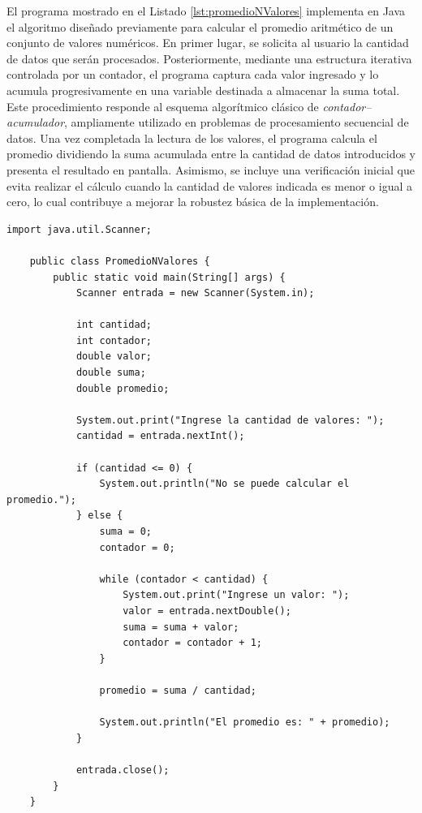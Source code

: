 \documentclass[12pt,twoside]{book}
\begin{document}
					El programa mostrado en el Listado \ref{lst:promedioNValores} implementa en Java el algoritmo diseñado previamente para calcular el promedio aritmético de un conjunto de valores numéricos. En primer lugar, se solicita al usuario la cantidad de datos que serán procesados. Posteriormente, mediante una estructura iterativa controlada por un contador, el programa captura cada valor ingresado y lo acumula progresivamente en una variable destinada a almacenar la suma total. Este procedimiento responde al esquema algorítmico clásico de \emph{contador--acumulador}, ampliamente utilizado en problemas de procesamiento secuencial de datos. Una vez completada la lectura de los valores, el programa calcula el promedio dividiendo la suma acumulada entre la cantidad de datos introducidos y presenta el resultado en pantalla. Asimismo, se incluye una verificación inicial que evita realizar el cálculo cuando la cantidad de valores indicada es menor o igual a cero, lo cual contribuye a mejorar la robustez básica de la implementación.
					
					\begin{lstlisting}[style=Java,caption={Calculo del Promedio de N Valores},label={lst:promedioNValores}]
	import java.util.Scanner;
	
	public class PromedioNValores {
		public static void main(String[] args) {
			Scanner entrada = new Scanner(System.in);
			
			int cantidad;
			int contador;
			double valor;
			double suma;
			double promedio;
			
			System.out.print("Ingrese la cantidad de valores: ");
			cantidad = entrada.nextInt();
			
			if (cantidad <= 0) {
				System.out.println("No se puede calcular el promedio.");
			} else {
				suma = 0;
				contador = 0;
				
				while (contador < cantidad) {
					System.out.print("Ingrese un valor: ");
					valor = entrada.nextDouble();
					suma = suma + valor;
					contador = contador + 1;
				}
				
				promedio = suma / cantidad;
				
				System.out.println("El promedio es: " + promedio);
			}
			
			entrada.close();
		}
	} \end{lstlisting}
					
\end{document}
